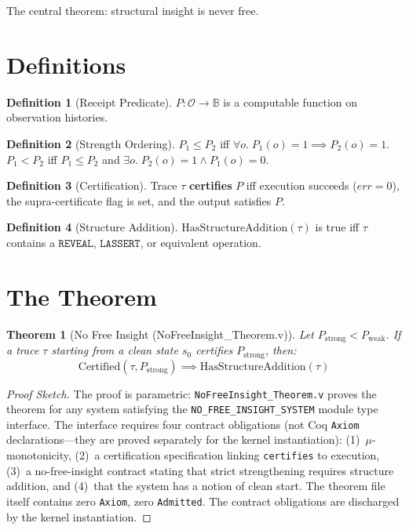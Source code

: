\documentclass[11pt, a4paper]{report}
\theoremstyle{definition}
\newtheorem{definition}{Definition}[chapter]
\theoremstyle{plain}
\newtheorem{theorem}{Theorem}[chapter]
\newcommand{\B}{\mathbb{B}}
\begin{document}
The central theorem: structural insight is never free.

\section{Definitions}

\begin{definition}[Receipt Predicate]
$P: \mathcal{O} \to \B$ is a computable function on observation histories.
\end{definition}

\begin{definition}[Strength Ordering]
$P_1 \le P_2$ iff $\forall o.\; P_1(o)=1 \implies P_2(o)=1$.
$P_1 < P_2$ iff $P_1 \le P_2$ and $\exists o.\; P_2(o)=1 \wedge P_1(o)=0$.
\end{definition}

\begin{definition}[Certification]
Trace $\tau$ \textbf{certifies} $P$ iff execution succeeds ($\mathit{err}=0$), the supra-certificate flag is set, and the output satisfies $P$.
\end{definition}

\begin{definition}[Structure Addition]
$\mathrm{HasStructureAddition}(\tau)$ is true iff $\tau$ contains a $\texttt{REVEAL}$, $\texttt{LASSERT}$, or equivalent operation.
\end{definition}

\section{The Theorem}

\begin{theorem}[No Free Insight {\normalfont (NoFreeInsight\_Theorem.v)}]
\label{thm:nfi}
Let $P_{\mathrm{strong}} < P_{\mathrm{weak}}$. If a trace $\tau$ starting from a clean state $s_0$ certifies $P_{\mathrm{strong}}$, then:
\[ \mathrm{Certified}(\tau, P_{\mathrm{strong}}) \implies \mathrm{HasStructureAddition}(\tau) \]
\end{theorem}

\begin{proof}[Proof Sketch]
The proof is parametric: \texttt{NoFreeInsight\_Theorem.v} proves the theorem for any system satisfying the \texttt{NO\_FREE\_INSIGHT\_SYSTEM} module type interface. The interface requires four contract obligations (not Coq \texttt{Axiom} declarations---they are proved separately for the kernel instantiation): (1)~$\mu$-monotonicity, (2)~a certification specification linking \texttt{certifies} to execution, (3)~a no-free-insight contract stating that strict strengthening requires structure addition, and (4)~that the system has a notion of clean start. The theorem file itself contains zero \texttt{Axiom}, zero \texttt{Admitted}. The contract obligations are discharged by the kernel instantiation.
\end{proof}
\end{document}
